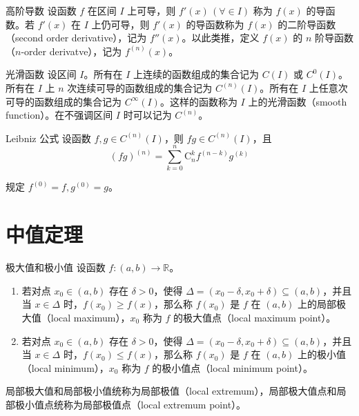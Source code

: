 \begin{definition}{高阶导数}
    设函数 $f$ 在区间 $I$ 上可导，则 $f'(x)\,(\forall \in I)$ 称为 $f(x)$ 的导函数。若 $f'(x)$ 在 $I$ 上仍可导，则 $f'(x)$ 的导函数称为 $f(x)$ 的二阶导函数（second order derivative），记为 $f''(x)$。以此类推，定义 $f(x)$ 的 $n$ 阶导函数（$n$-order derivatve），记为 $f^{(n)}(x)$。
\end{definition}


\begin{definition}{光滑函数}
    设区间 $I$。所有在 $I$ 上连续的函数组成的集合记为 $C(I)$ 或 $C^0(I)$。所有在 $I$ 上 $n$ 次连续可导的函数组成的集合记为 $C^{(n)}(I)$。所有在 $I$ 上任意次可导的函数组成的集合记为 $C^\infty(I)$。这样的函数称为 $I$ 上的光滑函数（smooth function）。在不强调区间 $I$ 时可以记为 $C^{(n)}$。
\end{definition}

\begin{theorem}{Leibniz 公式}
    设函数 $f, g \in C^{(n)}(I)$，则 $fg \in C^{(n)}(I)$，且
    \[(fg)^{(n)} = \sum_{k = 0}^{n} \mathrm{C}_{n}^{k}f^{(n - k)}g^{(k)} \]

    规定 $f^{(0)} = f, g^{(0)} = g$。
\end{theorem}

\section{中值定理}

\begin{definition}{极大值和极小值}
    设函数 $f:(a,b)\to \mathbb{R}$。
    \begin{enumerate}
        \item 若对点 $x_0 \in (a,b)$ 存在 $\delta > 0$，使得 $\Delta = (x_0 - \delta,x_0 + \delta) \subseteq (a,b)$，并且当 $x \in \Delta$ 时，$f(x_0)\geqslant f(x)$，那么称 $f(x_0)$ 是 $f$ 在 $(a,b)$ 上的局部极大值（local maximum），$x_0$ 称为 $f$ 的极大值点（local maximum point）。
        \item 若对点 $x_0 \in (a,b)$ 存在 $\delta > 0$，使得 $\Delta = (x_0 - \delta,x_0 + \delta) \subseteq (a,b)$，并且当 $x \in \Delta$ 时，$f(x_0)\leqslant f(x)$，那么称 $f(x_0)$ 是 $f$ 在 $(a,b)$ 上的极小值（local minimum），$x_0$ 称为 $f$ 的极小值点（local minimum point）。
    \end{enumerate}
    局部极大值和局部极小值统称为局部极值（local extremum），局部极大值点和局部极小值点统称为局部极值点（local extremum point）。
\end{definition}

